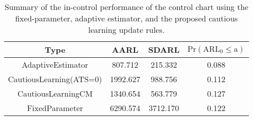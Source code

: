 \begin{table}[!h]

\caption{Summary of the in-control performance of the control chart using the fixed-parameter, adaptive estimator, and the proposed cautious learning update rules.}
\centering
\begin{tabular}[t]{cccc}
\toprule
Type & AARL & SDARL & $\text{Pr}(\text{ARL}_0 \leq \text{a})$\\
\midrule
AdaptiveEstimator & 807.712 & 215.332 & 0.088\\
CautiousLearning(ATS=0) & 1992.627 & 988.756 & 0.112\\
CautiousLearningCM & 1340.654 & 563.779 & 0.127\\
FixedParameter & 6290.574 & 3712.170 & 0.122\\
\bottomrule
\end{tabular}
\end{table}
